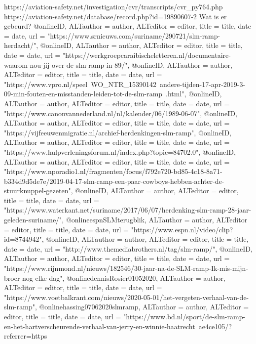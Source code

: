{{{https://aviation-safety.net/investigation/cvr/transcripts/cvr_py764.php 
https://aviation-safety.net/database/record.php?id=19890607-2 
Wat is er gebeurd?
@online{ID,	ALTauthor = {author},	ALTeditor = {editor},	title = {title},	date = {date},	url = {"https://www.srnieuws.com/suriname/290721/slm-ramp-herdacht/"},}
@online{ID,	ALTauthor = {author},	ALTeditor = {editor},	title = {title},	date = {date},	url = {"https://werkgroepcaraibischeletteren.nl/documentaire-waarom-nou-jij-over-de-slm-ramp-in-89/"},}
@online{ID,	ALTauthor = {author},	ALTeditor = {editor},	title = {title},	date = {date},	url = {"https://www.vpro.nl/speel~WO_NTR_15390142~andere-tijden-17-apr-2019-3-09-min-fouten-en-misstanden-leiden-tot-de-slm-ramp~.html"},}
@online{ID,	ALTauthor = {author},	ALTeditor = {editor},	title = {title},	date = {date},	url = {"https://www.canonvannederland.nl/nl/kalender/06/1989-06-07"},}
@online{ID,	ALTauthor = {author},	ALTeditor = {editor},	title = {title},	date = {date},	url = {"https://vijfeeuwenmigratie.nl/archief-herdenkingen-slm-ramp"},}
@online{ID,	ALTauthor = {author},	ALTeditor = {editor},	title = {title},	date = {date},	url = {"https://www.hulpverleningsforum.nl/index.php?topic=84702.0"},}
@online{ID,	ALTauthor = {author},	ALTeditor = {editor},	title = {title},	date = {date},	url = {"https://www.nporadio1.nl/fragmenten/focus/f792e720-bd85-4c18-8a71-b334d9d5de7e/2019-04-17-slm-ramp-een-paar-cowboys-hebben-achter-de-stuurknuppel-gezeten"},}
@online{ID,	ALTauthor = {author},	ALTeditor = {editor},	title = {title},	date = {date},	url = {"https://www.waterkant.net/suriname/2017/06/07/herdenking-slm-ramp-28-jaar-geleden-suriname/"},}
@online{espnSLMterugblik,	ALTauthor = {author},	ALTeditor = {editor},	title = {title},	date = {date},	url = {"https://www.espn.nl/video/clip?id=8744942"},}
@online{ID,	ALTauthor = {author},	ALTeditor = {editor},	title = {title},	date = {date},	url = {"http://www.themediabrothers.nl/tag/slm-ramp/"},}
@online{ID,	ALTauthor = {author},	ALTeditor = {editor},	title = {title},	date = {date},	url = {"https://www.rijnmond.nl/nieuws/182546/30-jaar-na-de-SLM-ramp-Ik-mis-mijn-broer-nog-elke-dag"},}
@online{dennisRosier01052020,	ALTauthor = {author},	ALTeditor = {editor},	title = {title},	date = {date},	url = {"https://www.voetbalkrant.com/nieuws/2020-05-01/het-vergeten-verhaal-van-de-slm-ramp"},}
@online{hassing07062020slmramp,	ALTauthor = {author},	ALTeditor = {editor},	title = {title},	date = {date},	url = {"https://www.bd.nl/sport/de-slm-ramp-en-het-hartverscheurende-verhaal-van-jerry-en-winnie-haatrecht~ae4ce105/?referrer=https%
}}}}}
